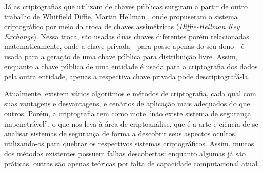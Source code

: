 Já as criptografias que utilizam de chaves públicas surgiram a partir de outro trabalho
de Whitfield Diffie, Martin Hellman \cite{artigo:diffiehellman-public}, onde propuseram
o sistema criptográfico por meio da troca de chaves assimétricas (\emph{Diffie-Hellman
Key Exchange}). Nessa troca, são usadas duas chaves diferentes porém relacionadas
matematicamente, onde a chave privada - para posse apenas do seu dono - é usada para a
geração de uma chave pública para distribuição livre. Assim, enquanto a chave pública
de uma entidade é usada para a criptografia dos dados pela outra entidade, apenas a
respectiva chave privada pode descriptografá-la.

Atualmente, existem vários algoritmos e métodos de criptografia, cada qual com suas
vantagens e desvantagens, e cenários de aplicação mais adequados do que outros. Porém,
a criptografia tem como mote ``não existe sistema de segurança impenetrável'', o que nos
leva à área de criptoanálise, que é a arte e ciência de se analisar sistemas de
segurança de forma a descobrir seus aspectos ocultos, utilizando-os para quebrar os
respectivos sistemas criptográficos. Assim, muitos dos métodos existentes possuem falhas
descobertas: enquanto algumas já são práticas, outras são apenas teóricas por falta de
capacidade computacional atual.





